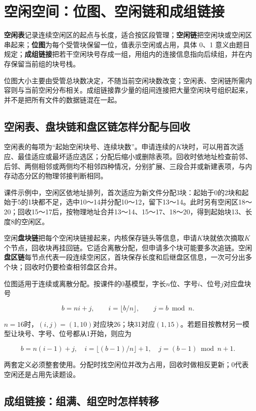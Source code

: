 \section{空闲空间：位图、空闲链和成组链接}\label{OS04-6-9}

\textbf{空闲表}记录连续空闲区的起点与长度，适合按区段管理；\textbf{空闲链}把空闲块或空闲区串起来；\textbf{位图}为每个受管块保留一位，值表示空闲或占用，具体 0、1 意义由题目规定；\textbf{成组链接}把若干空闲块号存成一组，用组内的连接信息指向后续组，并在内存保留当前组的块号栈。

位图大小主要由受管总块数决定，不随当前空闲块数改变；空闲表、空闲链所需内容则与当前空闲分布相关。成组链接靠少量的组间连接把大量空闲块号组织起来，并不是把所有文件的数据链混在一起。

\subsection{空闲表、盘块链和盘区链怎样分配与回收}\label{OS04-free-methods}

空闲表的每项为``起始空闲块号、连续块数''。申请连续的\(K\)块时，可以用首次适应、最佳适应或最坏适应选区；分配后缩小或删除表项。回收时依地址检查前邻、后邻、两侧相邻或两侧均不相邻四种情况，分别扩展、三段合并或新建表项，与内存动态分区的物理邻接判断相同。

课件示例中，空闲区依地址排列，首次适应为新文件分配3块：起始于0的2块和起始于5的1块都不足，选中10～14并分配10～12，留下13～14。此时另有空闲区18～20；回收15～17后，按物理地址合并13～14、15～17、18～20，得到起始块13、长度8的空闲区。

空闲\textbf{盘块链}把每个空闲块链接起来，内核保存链头等信息，申请\(K\)块就依次摘取\(K\)个节点，回收块再挂回链。它适合离散分配，但申请多个块可能要多次追链。空闲\textbf{盘区链}每节点代表一段连续空闲区，首块保存长度和后继盘区信息，一次可分出多个块；回收时仍要检查相邻盘区合并。

位图适用于连续或离散分配。按课件的0基模型，字长\(n\)位、字号\(i\)、位号\(j\)对应盘块号

\[b=ni+j,\qquad i=\lfloor b/n\rfloor,\qquad j=b\bmod n.\]

\(n=16\)时，\((i,j)=(1,10)\)对应块26；块31对应\((1,15)\)。若题目按教材另一模型让块号、字号、位号都从1开始，则应为

\[b=n(i-1)+j,\quad i=\lfloor(b-1)/n\rfloor+1,\quad j=(b-1)\bmod n+1.\]

两套定义必须整套使用。分配时找空闲位并改为占用，回收时做相反更新；0代表空闲还是占用先读题设。

\subsection{成组链接：组满、组空时怎样转移}\label{OS04-grouped-free}

